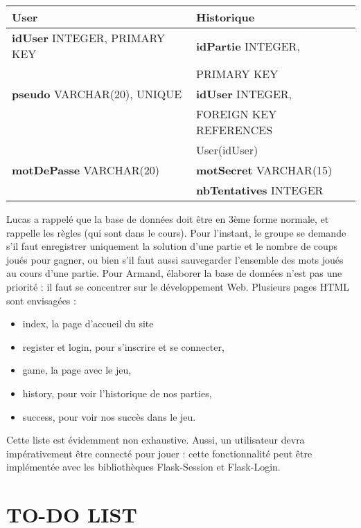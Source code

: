 \begin{center}
\begin{tabular}[c]{|l|l|}
    \hline
    \textbf{User} & \textbf{Historique} \\
    \hline
    \textbf{idUser} INTEGER, PRIMARY KEY & \textbf{idPartie} INTEGER, \\ & PRIMARY KEY \\
    \hline
    \textbf{pseudo} VARCHAR(20), UNIQUE & \textbf{idUser} INTEGER, \\ & FOREIGN KEY REFERENCES \\ & User(idUser) \\
    \hline
    \textbf{motDePasse} VARCHAR(20) & \textbf{motSecret} VARCHAR(15)\\
    \hline
    & \textbf{nbTentatives} INTEGER\\
    \hline
\end{tabular}
\end{center}

Lucas a rappelé que la base de données doit être en 3ème forme normale, et rappelle les règles (qui sont dans le cours). Pour l’instant, le groupe se demande s’il faut enregistrer uniquement la solution d’une partie et le nombre de coups joués pour gagner, ou bien s’il faut aussi sauvegarder l’ensemble des mots joués au cours d’une partie. Pour Armand, élaborer la base de données n’est pas une priorité : il faut se concentrer sur le développement Web. 
Plusieurs pages HTML sont envisagées :
\begin{itemize}
    \item index, la page d’accueil du site
    \item register et login, pour s’inscrire et se connecter,
    \item game, la page avec le jeu,
    \item history, pour voir l’historique de nos parties,
    \item success, pour voir nos succès dans le jeu.
\end{itemize}
Cette liste est évidemment non exhaustive. Aussi, un utilisateur devra impérativement être connecté pour jouer : cette fonctionnalité peut être implémentée avec les bibliothèques Flask-Session et Flask-Login.\\

\section*{TO-DO LIST}

